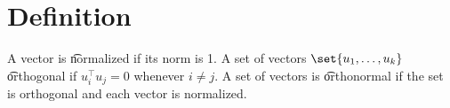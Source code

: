 
\section*{Definition}

A vector is \t{normalized} if its norm is 1.
A set of vectors $\set{u_1, \dots , u_k}$ \t{orthogonal} if $u_i^\top u_j = 0$ whenever $i \neq j$.
A set of vectors is \t{orthonormal} if the set is orthogonal and each vector is normalized.

\blankpage
